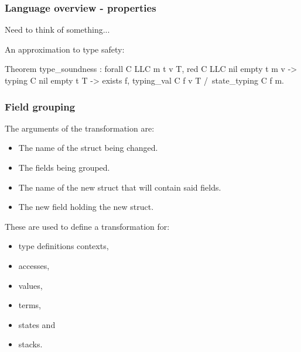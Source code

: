\begin{frame}[fragile]
\frametitle{Language overview - properties}

Need to think of something...

An approximation to type safety:
\begin{coq}
  Theorem type_soundness : forall C LLC m t v T,
    red C LLC nil empty t m v ->
    typing C nil empty t T ->
    exists f, typing_val C f v T 
  	  /\  state_typing C f m.
\end{coq}

\bigskip



\end{frame}


\begin{frame}[fragile]
\frametitle{Field grouping}

The arguments of the transformation are:
\begin{itemize}
	\item The name of the struct being changed.
	\item The fields being grouped.
	\item The name of the new struct that will contain said fields.
	\item The new field holding the new struct.
\end{itemize}

\bigskip

These are used to define a transformation for:
\\[0.75em]
\begin{minipage}{0.45\linewidth}
\begin{itemize}
	\item type definitions contexts,
	\item accesses,
	\item values,
\end{itemize}
\end{minipage}%
\begin{minipage}{0.45\linewidth}
\begin{itemize}
	\item terms,
	\item states and
	\item stacks.
\end{itemize}
\end{minipage}

\end{frame}


